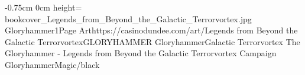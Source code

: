 \documentclass[letterpaper,openany,twoside,twocolumn]{book}
\begin{document}
	\DungeonSheetGeometry

		{-0.75cm}%
		{0cm}%
		{height=\paperheight}%
		{bookcover_Legends_from_Beyond_the_Galactic_Terrorvortex.jpg}%
		{%
			{Gloryhammer1}{Page \thepage}{Art}{https://casinodundee.com/art/}{Legends from Beyond the Galactic Terrorvortex}{GLORYHAMMER}%
		}%
		{{\darkcrystalfont}{Gloryhammer}{\digitalfont}{Galactic Terrorvortex}}%
		{{\digitalfont}{The Gloryhammer - Legends from Beyond the Galactic Terrorvortex Campaign}}%
		{GloryhammerMagic/black}%
	
	\clearpage
	\tableofcontents
	
	\DndSetThemeColor[PhbTan]
\end{document}

